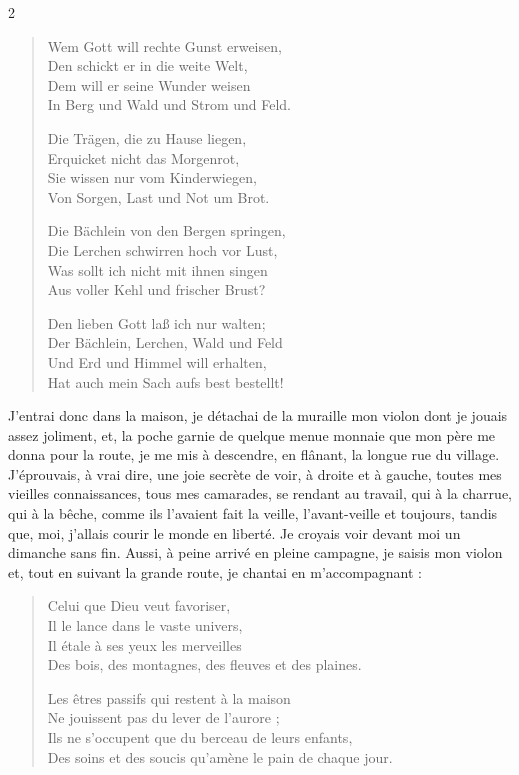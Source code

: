 \documentclass[a4paper,11pt]{article}
\begin{document}
\begin{paracol}{2}
{\begin{verse}
Wem Gott will rechte Gunst erweisen,\\
Den schickt er in die weite Welt,\\
Dem will er seine Wunder weisen\\
In Berg und Wald und Strom und Feld.

Die Trägen, die zu Hause liegen,\\
Erquicket nicht das Morgenrot,\\
Sie wissen nur vom Kinderwiegen,\\
Von Sorgen, Last und Not um Brot.

Die Bächlein von den Bergen springen,\\
Die Lerchen schwirren hoch vor Lust,\\
Was sollt ich nicht mit ihnen singen\\
Aus voller Kehl und frischer Brust?

Den lieben Gott laß ich nur walten;\\
Der Bächlein, Lerchen, Wald und Feld\\
Und Erd und Himmel will erhalten,\\
Hat auch mein Sach aufs best bestellt!
\end{verse}}
         {J’entrai donc dans la maison, je détachai de la muraille mon violon dont je jouais assez joliment, et, la poche garnie de quelque menue monnaie que mon père me donna pour la route, je me mis à descendre, en flânant, la longue rue du village. J’éprouvais, à vrai dire, une joie secrète de voir, à droite et à gauche, toutes mes vieilles connaissances, tous mes camarades, se rendant au travail, qui à la charrue, qui à la bêche, comme ils l’avaient fait la veille, l’avant-veille et toujours, tandis que, moi, j’allais courir le monde en liberté. Je croyais voir devant moi un dimanche sans fin. Aussi, à peine arrivé en pleine campagne, je saisis mon violon et, tout en suivant la grande route, je chantai en m’accompagnant :

\begin{verse}
Celui que Dieu veut favoriser,\\
Il le lance dans le vaste univers,\\
Il étale à ses yeux les merveilles\\
Des bois, des montagnes, des fleuves et des plaines.

Les êtres passifs qui restent à la maison\\
Ne jouissent pas du lever de l’aurore ;\\
Ils ne s’occupent que du berceau de leurs enfants,\\
Des soins et des soucis qu’amène le pain de chaque jour.


\end{verse}}
\end{paracol}
\end{document}
